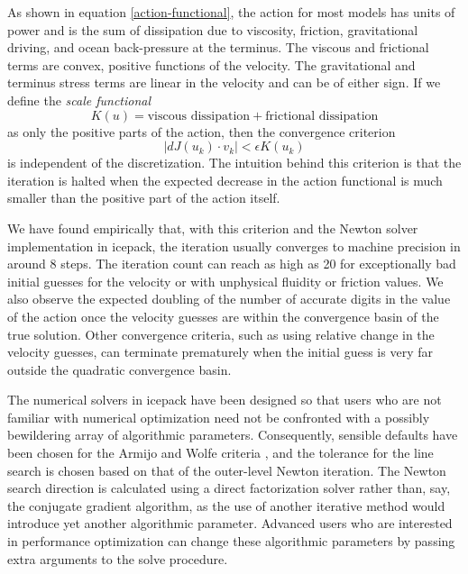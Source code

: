 \documentclass[journal abbreviation, manuscript]{copernicus}
\begin{document}
As shown in equation \eqref{action-functional}, the action for most models has units of power and is the sum of dissipation due to viscosity, friction, gravitational driving, and ocean back-pressure at the terminus.
The viscous and frictional terms are convex, positive functions of the velocity.
The gravitational and terminus stress terms are linear in the velocity and can be of either sign.
If we define the \emph{scale functional}
\begin{equation}
    K(u) = \text{viscous dissipation} + \text{frictional dissipation}
\end{equation}
as only the positive parts of the action, then the convergence criterion
\begin{equation}
    |dJ(u_k)\cdot v_k| < \epsilon K(u_k)
\end{equation}
is independent of the discretization.
The intuition behind this criterion is that the iteration is halted when the expected decrease in the action functional is much smaller than the positive part of the action itself.

We have found empirically that, with this criterion and the Newton solver implementation in icepack, the iteration usually converges to machine precision in around 8 steps.
The iteration count can reach as high as 20 for exceptionally bad initial guesses for the velocity or with unphysical fluidity or friction values.
We also observe the expected doubling of the number of accurate digits in the value of the action once the velocity guesses are within the convergence basin of the true solution.
Other convergence criteria, such as using relative change in the velocity guesses, can terminate prematurely when the initial guess is very far outside the quadratic convergence basin.

The numerical solvers in icepack have been designed so that users who are not familiar with numerical optimization need not be confronted with a possibly bewildering array of algorithmic parameters.
Consequently, sensible defaults have been chosen for the Armijo and Wolfe criteria \citep{nocedal2006numerical}, and the tolerance for the line search is chosen based on that of the outer-level Newton iteration.
The Newton search direction is calculated using a direct factorization solver rather than, say, the conjugate gradient algorithm, as the use of another iterative method would introduce yet another algorithmic parameter.
Advanced users who are interested in performance optimization can change these algorithmic parameters by passing extra arguments to the solve procedure.
\end{document}
